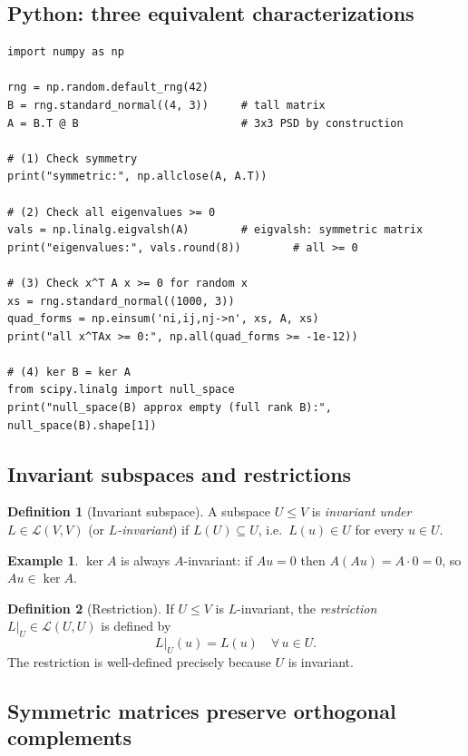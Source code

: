 \documentclass[11pt]{article}
\theoremstyle{definition}
\newtheorem{definition}{Definition}[section]
\newtheorem{example}{Example}[section]
\theoremstyle{plain}
\begin{document}
\subsection{Python: three equivalent characterizations}
\begin{lstlisting}
import numpy as np

rng = np.random.default_rng(42)
B = rng.standard_normal((4, 3))     # tall matrix
A = B.T @ B                         # 3x3 PSD by construction

# (1) Check symmetry
print("symmetric:", np.allclose(A, A.T))

# (2) Check all eigenvalues >= 0
vals = np.linalg.eigvalsh(A)        # eigvalsh: symmetric matrix
print("eigenvalues:", vals.round(8))        # all >= 0

# (3) Check x^T A x >= 0 for random x
xs = rng.standard_normal((1000, 3))
quad_forms = np.einsum('ni,ij,nj->n', xs, A, xs)
print("all x^TAx >= 0:", np.all(quad_forms >= -1e-12))

# (4) ker B = ker A
from scipy.linalg import null_space
print("null_space(B) approx empty (full rank B):", null_space(B).shape[1])
\end{lstlisting}


\subsection{Invariant subspaces and restrictions}

\begin{definition}[Invariant subspace]
  A subspace $U \le V$ is \emph{invariant under} $L \in \mathcal{L}(V,V)$
  (or \emph{$L$-invariant}) if $L(U) \subseteq U$, i.e.\
  $L(u) \in U$ for every $u \in U$.
\end{definition}

\begin{example}
  $\ker A$ is always $A$-invariant: if $Au = 0$ then $A(Au) = A \cdot 0 = 0$,
  so $Au \in \ker A$.
\end{example}

\begin{definition}[Restriction]
  If $U \le V$ is $L$-invariant, the \emph{restriction} $L\big|_U \in
  \mathcal{L}(U, U)$ is defined by
  \[
    L\big|_U(u) = L(u) \quad \forall\, u \in U.
  \]
  The restriction is well-defined precisely because $U$ is invariant.
\end{definition}

\subsection{Symmetric matrices preserve orthogonal complements}
\end{document}
